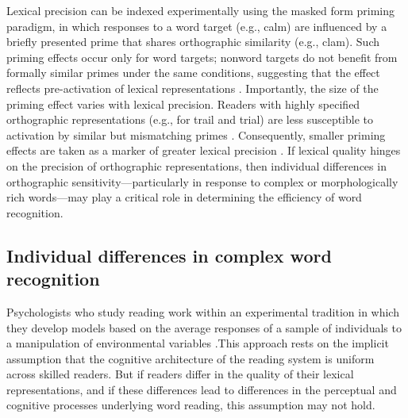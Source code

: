 \documentclass[preprint,12pt, authoryear, review]{elsarticle}
\begin{document}
Lexical precision can be indexed experimentally using the masked form priming paradigm, in which responses to a word target (e.g., calm) are influenced by a briefly presented prime that shares orthographic similarity (e.g., clam). Such priming effects occur only for word targets; nonword targets do not benefit from formally similar primes under the same conditions, suggesting that the effect reflects pre-activation of lexical representations \citep{andrewsLexicalPrecisionSkilled2010, forsterRepetitionPrimingFrequency1984}. Importantly, the size of the priming effect varies with lexical precision. Readers with highly specified orthographic representations (e.g., for trail and trial) are less susceptible to activation by similar but mismatching primes \citep{forsterBodiesAntibodiesNeighborhooddensity1994}. Consequently, smaller priming effects are taken as a marker of greater lexical precision \citep{andrewsLexicalPrecisionSkilled2010}. If lexical quality hinges on the precision of orthographic representations, then individual differences in orthographic sensitivity—particularly in response to complex or morphologically rich words—may play a critical role in determining the efficiency of word recognition.


\subsection{Individual differences in complex word recognition}

Psychologists who study reading work within an experimental tradition in which they develop models based on the average responses of a sample of individuals to a manipulation of environmental variables \citep{cronbachTwoDisciplinesScientific1957}.This approach rests on the implicit assumption that the cognitive architecture of the reading system is uniform across skilled readers. But if readers differ in the quality of their lexical representations, and if these differences lead to differences in the perceptual and cognitive processes underlying word reading, this assumption may not hold.
\end{document}
